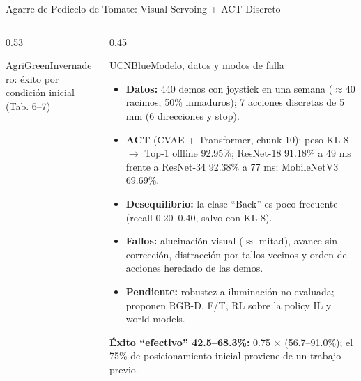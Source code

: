 \documentclass[aspectratio=169,10pt,xcolor={dvipsnames,table}]{beamer}
\newcommand{\CardHeightTall}{46mm}         %
\newcommand{\NoteFont}{\fontsize{5.6}{6.9}\selectfont}                  %
\newcommand{\TabFont}{\fontsize{5.3}{6.4}\selectfont}                    %
\begin{document}
\begin{frame}{Agarre de Pedicelo de Tomate: Visual Servoing + ACT Discreto}
\begin{columns}[T, onlytextwidth]
\begin{column}{0.53\textwidth}
\begin{Card}[height=\CardHeightTall, space to=\EspacioLibre]{AgriGreen}{Invernadero: éxito por condición inicial (Tab. 6--7)}
      \end{Card}
    \end{column}
    \begin{column}{0.45\textwidth}
      \begin{Card}[height=\CardHeightTall]{UCNBlue}{Modelo, datos y modos de falla}
        {\NoteFont
        \begin{itemize}\setlength{\itemsep}{0.8pt}
          \item[\textcolor{UCNBlue}{$\blacktriangleright$}] \textbf{Datos:} 440 demos con joystick en una semana ($\approx$40 racimos; 50\% inmaduros); 7 acciones discretas de 5 mm (6 direcciones y stop).
          \item[\textcolor{UCNBlue}{$\blacktriangleright$}] \textbf{ACT} (CVAE + Transformer, chunk 10): peso KL 8 $\to$ Top-1 offline 92.95\%; ResNet-18 91.18\% a 49 ms frente a ResNet-34 92.38\% a 77 ms; MobileNetV3 69.69\%.
          \item[\textcolor{UCNBlue}{$\blacktriangleright$}] \textbf{Desequilibrio:} la clase ``Back'' es poco frecuente (recall 0.20--0.40, salvo con KL 8).
          \item[\textcolor{UCNBlue}{$\blacktriangleright$}] \textbf{Fallos:} alucinación visual ($\approx$ mitad), avance sin corrección, distracción por tallos vecinos y orden de acciones heredado de las demos.
          \item[\textcolor{UCNBlue}{$\blacktriangleright$}] \textbf{Pendiente:} robustez a iluminación no evaluada; proponen RGB-D, F/T, RL sobre la policy IL y world models.
        \end{itemize}
        \vspace{0.4mm}
        {\TabFont\textcolor{UCNTerracotta}{\textbf{Éxito ``efectivo'' 42.5--68.3\%:}} \textcolor{TextDark!80}{0.75 $\times$ (56.7--91.0\%); el 75\% de posicionamiento inicial proviene de un trabajo previo.}\par}}
      \end{Card}
    \end{column}
  \end{columns}
\end{frame}
\end{document}

